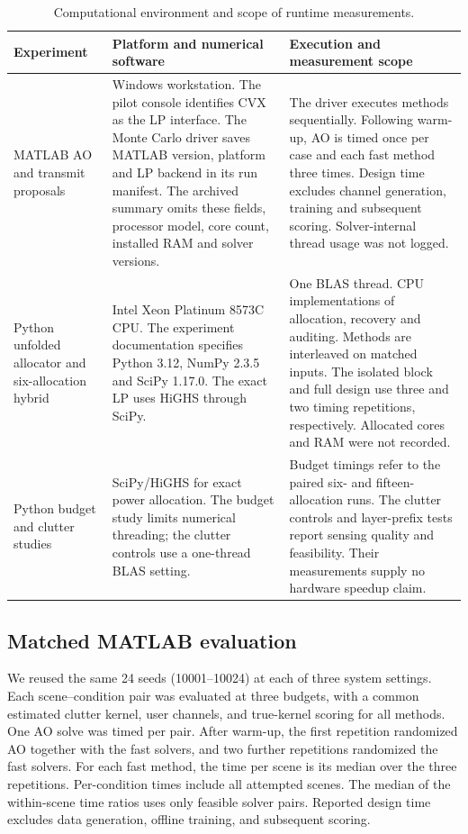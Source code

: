 \documentclass[journal]{IEEEtran}
\begin{document}
\begin{table}[t]\centering\footnotesize
\caption{Computational environment and scope of runtime measurements.}\label{tab:resources}
\begin{tabular}{@{}p{}p{}p{}@{}}\toprule
Experiment & Platform and numerical software & Execution and measurement scope\\\midrule
MATLAB AO and transmit proposals &
Windows workstation. The pilot console identifies CVX as the LP interface. The Monte Carlo driver saves MATLAB version, platform and LP backend in its run manifest. The archived summary omits these fields, processor model, core count, installed RAM and solver versions. &
The driver executes methods sequentially. Following warm-up, AO is timed once per case and each fast method three times. Design time excludes channel generation, training and subsequent scoring. Solver-internal thread usage was not logged.\\
Python unfolded allocator and six-allocation hybrid &
Intel Xeon Platinum 8573C CPU. The experiment documentation specifies Python 3.12, NumPy 2.3.5 and SciPy 1.17.0. The exact LP uses HiGHS through SciPy. &
One BLAS thread. CPU implementations of allocation, recovery and auditing. Methods are interleaved on matched inputs. The isolated block and full design use three and two timing repetitions, respectively. Allocated cores and RAM were not recorded.\\
Python budget and clutter studies &
SciPy/HiGHS for exact power allocation. The budget study limits numerical threading; the clutter controls use a one-thread BLAS setting. &
Budget timings refer to the paired six- and fifteen-allocation runs. The clutter controls and layer-prefix tests report sensing quality and feasibility. Their measurements supply no hardware speedup claim.\\\bottomrule
\end{tabular}\end{table}

\subsection{Matched MATLAB evaluation}
We reused the same 24 seeds (10001--10024) at each of three system settings. Each scene--condition pair was evaluated at three budgets, with a common estimated clutter kernel, user channels, and true-kernel scoring for all methods. One AO solve was timed per pair. After warm-up, the first repetition randomized AO together with the fast solvers, and two further repetitions randomized the fast solvers. For each fast method, the time per scene is its median over the three repetitions. Per-condition times include all attempted scenes. The median of the within-scene time ratios uses only feasible solver pairs. Reported design time excludes data generation, offline training, and subsequent scoring.
\end{document}

